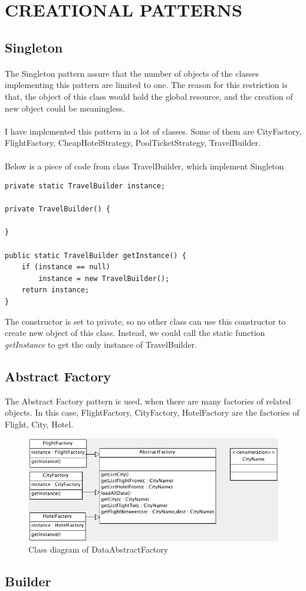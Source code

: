 \section{CREATIONAL PATTERNS}
\subsection{Singleton}

\paragraph{}
The Singleton pattern assure that the number of objects of the classes implementing this pattern are limited to one. The reason for this restriction is that, the object of this class would hold the global resource, and the creation of new object could be meaningless.

\paragraph{}
I have implemented this pattern in a lot of classes. Some of them are CityFactory, FlightFactory, CheapHotelStrategy, PoolTicketStrategy, TravelBuilder.

\paragraph{}
Below is a piece of code from class TravelBuilder, which implement Singleton

\begin{lstlisting}
private static TravelBuilder instance;

private TravelBuilder() {

}

public static TravelBuilder getInstance() {
	if (instance == null)
		instance = new TravelBuilder();
	return instance;
}
\end{lstlisting}

The constructor is set to private, so no other class can use this constructor to create new object of this class. Instead, we could call the static function \textit{getInstance} to get the only instance of TravelBuilder.

\newpage
\subsection{Abstract Factory}
The Abstract Factory pattern is used, when there are many factories of related objects. In this case, FlightFactory, CityFactory, HotelFactory are the factories of Flight, City, Hotel. 

\begin{figure}[h]
\centering
\includegraphics[width=12cm]{project/images/factory.png}
\caption{Class diagram of DataAbstractFactory}
\end{figure}

\subsection{Builder}